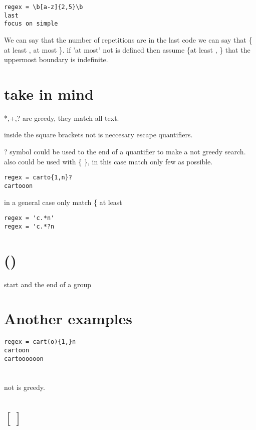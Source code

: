 \documentclass[10pt,a4paper]{article}
\begin{document}
\begin{verbatim}
regex = \b[a-z]{2,5}\b
last 
focus on simple 
\end{verbatim}

We can say that the number of repetitions are in the last code we can say that \{ at least , at most \}.
if 'at most' not is defined then assume \{at least , \} that the uppermost boundary is indefinite. 



\section{take in mind}
*,+,? are greedy, they match all text.

inside the square brackets not is neccesary escape quantifiers.

? symbol could be used to the end of a quantifier to make a not greedy search.
also could be used with \{ \}, in this case match only few as possible.

\begin{verbatim}
regex = carto{1,n}?
cartooon
\end{verbatim}

in a general case only match \{ at least 


\begin{lstlisting}
regex = 'c.*n'
regex = 'c.*?n
\end{lstlisting}



\section{()}
start and the end of a group



\section{Another examples}
\begin{verbatim}
regex = cart(o){1,}n
cartoon 
cartoooooon 
\end{verbatim}

\section{\textbar}
not is greedy.


\section{$[]$}
\end{document}
